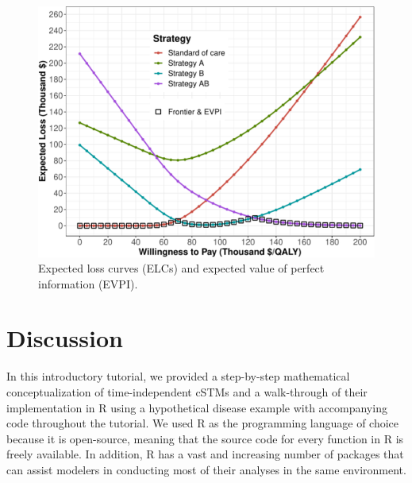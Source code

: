 \documentclass[
]{article}
\begin{document}
\begin{figure}[H]

{\centering \includegraphics{figs/ELC-1} 

}

\caption{Expected loss curves (ELCs) and expected value of perfect information (EVPI).}\label{fig:ELC}
\end{figure}

\hypertarget{discussion}{%
\section{Discussion}\label{discussion}}

In this introductory tutorial, we provided a step-by-step mathematical conceptualization of time-independent cSTMs and a walk-through of their implementation in R using a hypothetical disease example with accompanying code throughout the tutorial. We used R as the programming language of choice because it is open-source, meaning that the source code for every function in R is freely available. In addition, R has a vast and increasing number of packages that can assist modelers in conducting most of their analyses in the same environment.
\end{document}
